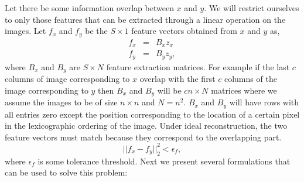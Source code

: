 Let there be some information overlap between $x$ and $y$. We will restrict ourselves to only those features that can be extracted through a linear operation on the images. Let $f_x$ and $f_y$ be the $S \times 1$ feature vectors obtained from $x$ and $y$ as,
\begin{eqnarray}
f_x &=& B_x z_x\\
f_y &=& B_y z_y,
\end{eqnarray}
where $B_x$ and $B_y$ are $S \times N$ feature extraction matrices. For example if the last $c$ columns of image corresponding to $x$ overlap with the first $c$ columns of the image corresponding to $y$ then $B_x$ and $B_y$ will be $cn \times N$ matrices where we assume the images to be of size $n \times n$ and $N = n^2$. $B_x$ and $B_y$ will have rows with all entries zero except the position corresponding to the location of a certain pixel in the lexicographic ordering of the image. Under ideal reconstruction, the two feature vectors must match because they correspond to the overlapping part.
\begin{equation}
||f_x - f_y||_2^2 < \epsilon_f,
\end{equation}
where $\epsilon_f$ is some tolerance threshold. 
Next we present several formulations that can be used to solve this problem:
